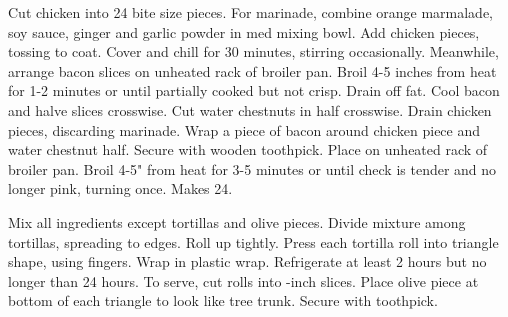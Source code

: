 \begin{minipage}{\linewidth}
\end{minipage}\par\begin{minipage}{\linewidth}  
{Cut chicken into 24 bite size pieces. For marinade, combine orange marmalade, soy sauce, ginger and garlic powder in med mixing bowl. Add chicken pieces, tossing to coat. Cover and chill for 30 minutes, stirring occasionally. Meanwhile, arrange bacon slices on unheated rack of broiler pan. Broil 4-5 inches from heat for 1-2 minutes or until partially cooked but not crisp. Drain off fat. Cool bacon and halve slices crosswise. Cut water chestnuts in half crosswise. Drain chicken pieces, discarding marinade. Wrap a piece of bacon around chicken piece and water chestnut half. Secure with wooden toothpick. Place on unheated rack of broiler pan. Broil 4-5" from heat for 3-5 minutes or until check is tender and no longer pink, turning once. Makes 24.}

\end{minipage}\par\begin{minipage}{\linewidth} 
{Mix all ingredients except tortillas and olive pieces. Divide mixture among tortillas, spreading to edges. Roll up tightly. Press each tortilla roll into triangle shape, using fingers. Wrap in plastic wrap. Refrigerate at least 2 hours but no longer than 24 hours.
To serve, cut rolls into -inch slices. Place olive piece at bottom of each triangle to look like tree trunk. Secure with toothpick.}


\end{minipage}
